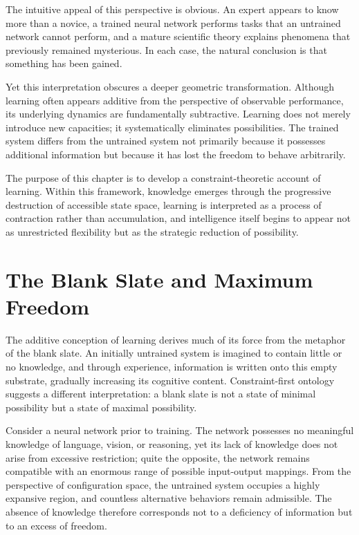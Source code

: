 \documentclass[11pt,oneside]{book}
\theoremstyle{plain}
\theoremstyle{definition}
\theoremstyle{remark}
\begin{document}
The intuitive appeal of this perspective is obvious. An expert appears to know more than a novice, a trained neural network performs tasks that an untrained network cannot perform, and a mature scientific theory explains phenomena that previously remained mysterious. In each case, the natural conclusion is that something has been gained.

Yet this interpretation obscures a deeper geometric transformation. Although learning often appears additive from the perspective of observable performance, its underlying dynamics are fundamentally subtractive. Learning does not merely introduce new capacities; it systematically eliminates possibilities. The trained system differs from the untrained system not primarily because it possesses additional information but because it has lost the freedom to behave arbitrarily.

The purpose of this chapter is to develop a constraint-theoretic account of learning. Within this framework, knowledge emerges through the progressive destruction of accessible state space, learning is interpreted as a process of contraction rather than accumulation, and intelligence itself begins to appear not as unrestricted flexibility but as the strategic reduction of possibility.

\section{The Blank Slate and Maximum Freedom}

The additive conception of learning derives much of its force from the metaphor of the blank slate. An initially untrained system is imagined to contain little or no knowledge, and through experience, information is written onto this empty substrate, gradually increasing its cognitive content. Constraint-first ontology suggests a different interpretation: a blank slate is not a state of minimal possibility but a state of maximal possibility.

Consider a neural network prior to training. The network possesses no meaningful knowledge of language, vision, or reasoning, yet its lack of knowledge does not arise from excessive restriction; quite the opposite, the network remains compatible with an enormous range of possible input-output mappings. From the perspective of configuration space, the untrained system occupies a highly expansive region, and countless alternative behaviors remain admissible. The absence of knowledge therefore corresponds not to a deficiency of information but to an excess of freedom.
\end{document}
